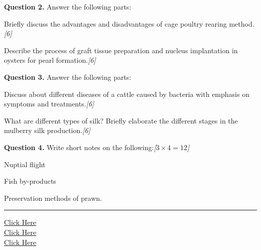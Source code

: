\documentclass[11pt,a4paper]{article}
\newcommand{\pts}[1]{\hfill   \textit{[#1]}}
\begin{document}
\medskip


\noindent   \textbf{Question 2.} Answer the following parts:

\begin{parts}
  \item Briefly discuss the advantages and disadvantages of cage poultry rearing method.\pts{6}
  \item Describe the process of graft tissue preparation and nucleus implantation in oysters for pearl formation.\pts{6}
\end{parts}

\medskip


\noindent   \textbf{Question 3.} Answer the following parts:

\begin{parts}
  \item Discuss about different diseases of a cattle caused by bacteria with emphasis on symptoms and treatments.\pts{6}
  \item What are different types of silk? Briefly elaborate the different stages in the mulberry silk production.\pts{6}
\end{parts}

\medskip


\noindent   \textbf{Question 4.} Write short notes on the following:\pts{$3  \times 4 = 12$}

\begin{parts}
  \item Nuptial flight
  \item Fish by-products
  \item Preservation methods of prawn.
\end{parts}

\vfill
\rule{\linewidth}{0.4pt}

\begin{center}\small
\href{https://bhu-exam.vercel.app/}{Click Here}\\[4pt]\href{https://me-aryan.vercel.app/}{Click Here}\\[4pt]\href{https://quashan-me.vercel.app/}{Click Here}
\end{center}
\end{document}

